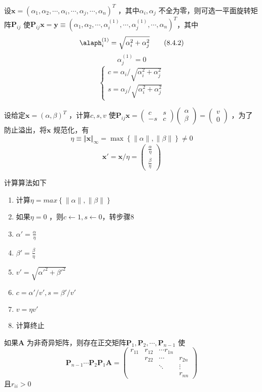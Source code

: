 \documentclass[a4paper]{article}
\begin{document}
设$\mathbf{x} = (\alpha_1, \alpha_2, \cdots, \alpha_i, \cdots, \alpha_j, \cdots, \alpha_n)^{T}$ ，其中$\alpha_i, \alpha_j$ 不全为零，则可选一平面旋转矩阵$\mathbf{P}_{ij}$ 使$\mathbf{P}_{ij}\mathbf{x} = \mathbf{y} \equiv (\alpha_1, \alpha_2, \cdots, \alpha_i^{(1)}, \cdots, \alpha_j^{(1)}, \cdots, \alpha_n)^{T} $，其中
\[
\alaph_i^{(1)} = \sqrt{\alpha_i^2 + \alpha_j^2} \tag{8.4.2} \label{eq:8.4.2} 
\] 
\[
\alpha_j^{(1)} = 0 \tag{8.4.3} \label{eq:8.4.3} 
\] 
\[
	\tag{8.4.4} \label{eq:8.4.4} 
\begin{cases}
c = \alpha_i / \sqrt{\alpha_i^2 + \alpha_j^2} 	\\
s = \alpha_j / \sqrt{\alpha_i^2 + \alpha_j^2}  
\end{cases} 
\] 

设给定$\mathbf{x} = (\alpha, \beta)^{T}$ ，计算$c, s, v$ 使$\mathbf{P}_{ij} \mathbf{x} = \begin{pmatrix} c & s \\ -s & c \end{pmatrix} \begin{pmatrix} \alpha \\ \beta \end{pmatrix} = \begin{pmatrix} v \\ 0 \end{pmatrix} $ ，为了防止溢出，将$\mathbf{x}$ 规范化，有
\[
\eta \equiv \Vert \mathbf{x} \Vert_\infty = \max \left\{ \|\alpha\|, \|\beta\| \right\} \neq 0
\] 
\[
\mathbf{x}' = \mathbf{x} / \eta = \begin{pmatrix} \frac{\alpha}{\eta} \\ \frac{\beta}{\eta} \end{pmatrix} 
\] 

计算算法如下
\begin{enumerate}
	\item 计算$\eta = max \left\{ \|\alpha\|, \|\beta\| \right\} $
	\item 如果$\eta = 0$ ，则$c \gets 1, s \gets 0$，转步骤8
	\item $\alpha' = \frac{\alpha}{\eta}$ 
	\item $\beta' = \frac{\beta}{\eta}$ 
	\item $v' = \sqrt{\alpha'^2 + \beta'^2} $ 
	\item $c = \alpha'/v', s = \beta'/v'$ 
	\item $v = \eta v'$
	\item 计算终止
\end{enumerate}

\begin{theorem}
	如果$\mathbf{A}$ 为非奇异矩阵，则存在正交矩阵$\mathbf{P}_1, \mathbf{P}_2, \cdots, \mathbf{P}_{n-1}$ 使
	\[
		\mathbf{P}_{n-1} \cdots \mathbf{P}_2 \mathbf{P}_1 \mathbf{A} = \begin{pmatrix} 
			r_{11} & r_{12} & \cdots r_{1n} \\
			       & r_{22} & \cdots & r_{2n} \\
			       & & \ddots & \vdots \\
			       & & & r_{nn}
		\end{pmatrix} \tag{8.4.5} \label{eq:8.4.5} 
	\] 
	且$r_{ii} > 0$
\end{theorem}
\end{document}
